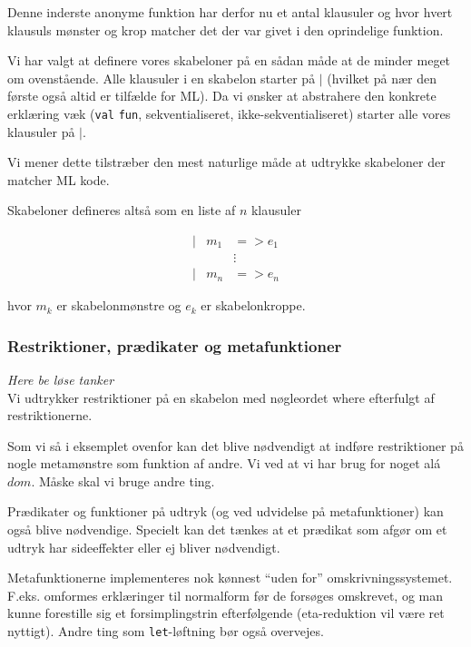\documentclass[oneside]{memoir}
\theoremstyle{definition}
\begin{document}
Denne inderste anonyme funktion har derfor nu et antal klausuler og hvor hvert
klausuls mønster og krop matcher det der var givet i den oprindelige
funktion.

Vi har valgt at definere vores skabeloner på en sådan måde at de minder meget om
ovenstående. Alle klausuler i en skabelon starter på $|$ (hvilket på nær den
første også altid er tilfælde for ML). Da vi ønsker at abstrahere den konkrete
erklæring væk (\texttt{val} \texttt{fun}, sekventialiseret,
ikke-sekventialiseret) starter alle vores klausuler på $|$.

Vi mener dette tilstræber den mest naturlige måde at udtrykke skabeloner der
matcher ML kode.

Skabeloner defineres altså som en liste af $n$ klausuler

\begin{eqnarray*}[rqrl]
| & m_1 & => e_1 \\
  &  & \vdots \\
| & m_n & => e_n
\end{eqnarray*}

hvor $m_k$ er skabelonmønstre og $e_k$ er skabelonkroppe.


\subsubsection{Restriktioner, prædikater og metafunktioner}
\textit{Here be løse tanker}\\

Vi udtrykker restriktioner på en skabelon med nøgleordet \textsf{where}
efterfulgt af restriktionerne.

Som vi så i eksemplet ovenfor kan det blive nødvendigt at indføre restriktioner
på nogle metamønstre som funktion af andre. Vi ved at vi har brug for noget alá
$dom$. Måske skal vi bruge andre ting.

Prædikater og funktioner på udtryk (og ved udvidelse på metafunktioner) kan også
blive nødvendige. Specielt kan det tænkes at et prædikat som afgør om et udtryk
har sideeffekter eller ej bliver nødvendigt.

Metafunktionerne implementeres nok kønnest ``uden for''
omskrivningssystemet. F.eks. omformes erklæringer til normalform før de
forsøges omskrevet, og man kunne forestille sig et forsimplingstrin
efterfølgende (eta-reduktion vil være ret nyttigt). Andre ting som
\texttt{let}-løftning bør også overvejes.
\end{document}
